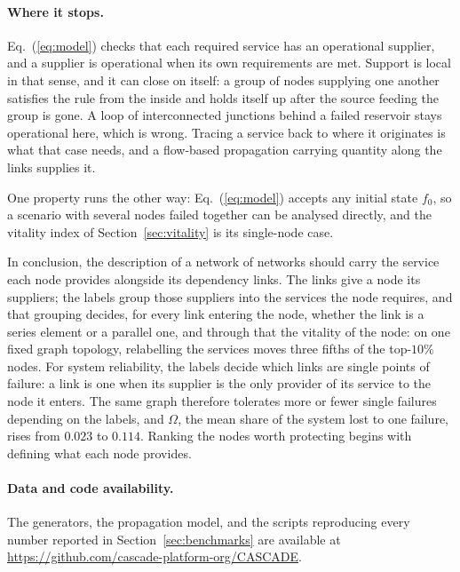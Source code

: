 \documentclass{svproc}
\begin{document}
\paragraph{Where it stops.}
Eq.~(\ref{eq:model}) checks that each required service has an operational supplier,
and a supplier is operational when its own requirements are met. Support is local
in that sense, and it can close on itself: a group of nodes supplying one another
satisfies the rule from the inside and holds itself up after the source feeding the
group is gone. A loop of interconnected junctions behind a failed reservoir stays
operational here, which is wrong. Tracing a service back to where it originates is
what that case needs, and a flow-based propagation carrying quantity along the
links supplies it.

One property runs the other way: Eq.~(\ref{eq:model}) accepts any initial state
$f_0$, so a scenario with several nodes failed together can be analysed directly,
and the vitality index of Section~\ref{sec:vitality} is its single-node case.

In conclusion, the description of a network of networks should carry the service
each node provides alongside its dependency links. The links give a node its
suppliers; the labels group those suppliers into the services the node requires,
and that grouping decides, for every link entering the node, whether the link is a
series element or a parallel one, and through that the vitality of the node: on one
fixed graph topology, relabelling the services moves three fifths of the top-$10\%$
nodes. For system reliability, the labels decide which links are single points of failure:
a link is one when its supplier is the only provider of its service to the node it enters.
The same graph therefore tolerates more or fewer single failures depending on the labels,
and $\Omega$, the mean share of the system lost to one failure, rises from $0.023$ to
$0.114$. Ranking the nodes worth protecting begins with defining what each node provides.


\paragraph{Data and code availability.}
The generators, the propagation model, and the scripts reproducing every number
reported in Section~\ref{sec:benchmarks} are available at
\url{https://github.com/cascade-platform-org/CASCADE}.



\end{document}
